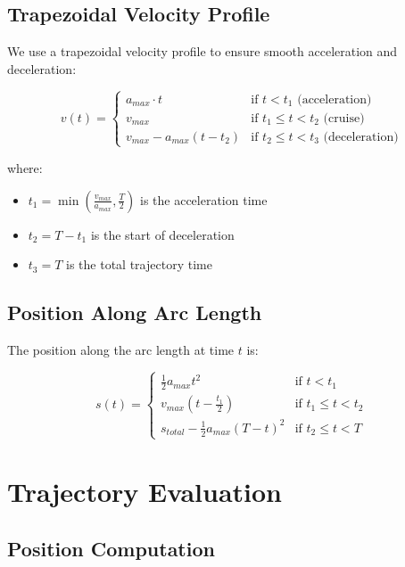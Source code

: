 \documentclass[11pt]{article}
\begin{document}
\subsection{Trapezoidal Velocity Profile}

We use a trapezoidal velocity profile to ensure smooth acceleration and deceleration:

\begin{equation}
v(t) = \begin{cases}
a_{max} \cdot t & \text{if } t < t_1 \text{ (acceleration)} \\
v_{max} & \text{if } t_1 \leq t < t_2 \text{ (cruise)} \\
v_{max} - a_{max}(t - t_2) & \text{if } t_2 \leq t < t_3 \text{ (deceleration)}
\end{cases}
\end{equation}

where:
\begin{itemize}
    \item $t_1 = \min\left(\frac{v_{max}}{a_{max}}, \frac{T}{2}\right)$ is the acceleration time
    \item $t_2 = T - t_1$ is the start of deceleration
    \item $t_3 = T$ is the total trajectory time
\end{itemize}

\subsection{Position Along Arc Length}

The position along the arc length at time $t$ is:

\begin{equation}
s(t) = \begin{cases}
\frac{1}{2}a_{max}t^2 & \text{if } t < t_1 \\
v_{max}(t - \frac{t_1}{2}) & \text{if } t_1 \leq t < t_2 \\
s_{total} - \frac{1}{2}a_{max}(T-t)^2 & \text{if } t_2 \leq t < T
\end{cases}
\end{equation}

\section{Trajectory Evaluation}

\subsection{Position Computation}
\end{document}
